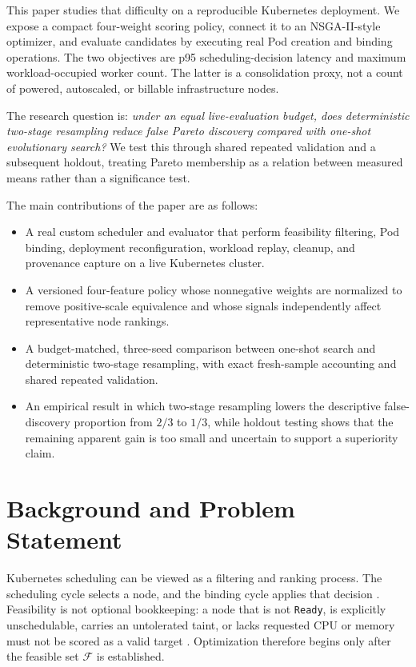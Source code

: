 \documentclass[conference]{IEEEtran}
\begin{document}
This paper studies that difficulty on a reproducible Kubernetes deployment. We expose a compact four-weight scoring policy, connect it to an NSGA-II-style optimizer, and evaluate candidates by executing real Pod creation and binding operations. The two objectives are p95 scheduling-decision latency and maximum workload-occupied worker count. The latter is a consolidation proxy, not a count of powered, autoscaled, or billable infrastructure nodes.

The research question is: \emph{under an equal live-evaluation budget, does deterministic two-stage resampling reduce false Pareto discovery compared with one-shot evolutionary search?} We test this through shared repeated validation and a subsequent holdout, treating Pareto membership as a relation between measured means rather than a significance test.

The main contributions of the paper are as follows:
\begin{itemize}
\item A real custom scheduler and evaluator that perform feasibility filtering, Pod binding, deployment reconfiguration, workload replay, cleanup, and provenance capture on a live Kubernetes cluster.
\item A versioned four-feature policy whose nonnegative weights are normalized to remove positive-scale equivalence and whose signals independently affect representative node rankings.
\item A budget-matched, three-seed comparison between one-shot search and deterministic two-stage resampling, with exact fresh-sample accounting and shared repeated validation.
\item An empirical result in which two-stage resampling lowers the descriptive false-discovery proportion from $2/3$ to $1/3$, while holdout testing shows that the remaining apparent gain is too small and uncertain to support a superiority claim.
\end{itemize}

\section{Background and Problem Statement}
Kubernetes scheduling can be viewed as a filtering and ranking process. The scheduling cycle selects a node, and the binding cycle applies that decision \cite{ref-k8s-framework}. Feasibility is not optional bookkeeping: a node that is not \texttt{Ready}, is explicitly unschedulable, carries an untolerated taint, or lacks requested CPU or memory must not be scored as a valid target \cite{ref-k8s-node-status,ref-k8s-taints}. Optimization therefore begins only after the feasible set $\mathcal{F}$ is established.
\end{document}
